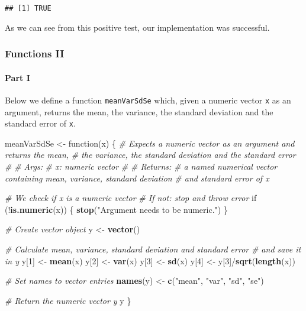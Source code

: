 \documentclass[11,]{article}
\newenvironment{Shaded}{\begin{snugshade}}{\end{snugshade}}
\newcommand{\KeywordTok}[1]{\textcolor[rgb]{0.13,0.29,0.53}{\textbf{{#1}}}}
\newcommand{\DecValTok}[1]{\textcolor[rgb]{0.00,0.00,0.81}{{#1}}}
\newcommand{\StringTok}[1]{\textcolor[rgb]{0.31,0.60,0.02}{{#1}}}
\newcommand{\CommentTok}[1]{\textcolor[rgb]{0.56,0.35,0.01}{\textit{{#1}}}}
\newcommand{\NormalTok}[1]{{#1}}
\let\oldparagraph\paragraph
\renewcommand{\paragraph}[1]{\oldparagraph{#1}\mbox{}}
\begin{document}
\begin{verbatim}
## [1] TRUE
\end{verbatim}

As we can see from this positive test, our implementation was
successful.

\subsubsection{Functions II}\label{functions-ii}

\paragraph{Part I}\label{part-i}

Below we define a function \texttt{meanVarSdSe} which, given a numeric
vector \texttt{x} as an argument, returns the mean, the variance, the
standard deviation and the standard error of \texttt{x}.

\begin{Shaded}
\begin{Highlighting}[]
\NormalTok{meanVarSdSe <-}\StringTok{ }\NormalTok{function(x) \{}
  \CommentTok{# Expects a numeric vector as an argument and returns the mean,}
  \CommentTok{# the variance, the standard deviation and the standard error}
  \CommentTok{# }
  \CommentTok{# Args:}
  \CommentTok{#   x: numeric vector}
  \CommentTok{#}
  \CommentTok{# Returns:}
  \CommentTok{#   a named numerical vector containing mean, variance, standard deviation}
  \CommentTok{#   and standard error of x}
  
  \CommentTok{# We check if x is a numeric vector}
  \CommentTok{# If not: stop and throw error}
  \NormalTok{if (!}\KeywordTok{is.numeric}\NormalTok{(x)) \{}
    \KeywordTok{stop}\NormalTok{(}\StringTok{"Argument needs to be numeric."}\NormalTok{)}
  \NormalTok{\}}
  
  \CommentTok{# Create vector object}
  \NormalTok{y <-}\StringTok{ }\KeywordTok{vector}\NormalTok{()}
  
  \CommentTok{# Calculate mean, variance, standard deviation and standard error}
  \CommentTok{# and save it in y}
  \NormalTok{y[}\DecValTok{1}\NormalTok{] <-}\StringTok{ }\KeywordTok{mean}\NormalTok{(x)}
  \NormalTok{y[}\DecValTok{2}\NormalTok{] <-}\StringTok{ }\KeywordTok{var}\NormalTok{(x)}
  \NormalTok{y[}\DecValTok{3}\NormalTok{] <-}\StringTok{ }\KeywordTok{sd}\NormalTok{(x)}
  \NormalTok{y[}\DecValTok{4}\NormalTok{] <-}\StringTok{ }\NormalTok{y[}\DecValTok{3}\NormalTok{]/}\KeywordTok{sqrt}\NormalTok{(}\KeywordTok{length}\NormalTok{(x))}
  
  \CommentTok{# Set names to vector entries}
  \KeywordTok{names}\NormalTok{(y) <-}\StringTok{ }\KeywordTok{c}\NormalTok{(}\StringTok{"mean"}\NormalTok{, }\StringTok{"var"}\NormalTok{, }\StringTok{"sd"}\NormalTok{, }\StringTok{"se"}\NormalTok{)}
  
  \CommentTok{# Return the numeric vector y}
  \NormalTok{y}
\NormalTok{\}}
\end{Highlighting}
\end{Shaded}
\end{document}
